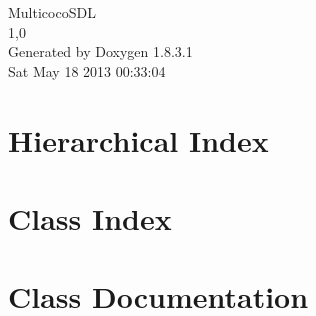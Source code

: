\documentclass{book}
\begin{document}
\hypersetup{pageanchor=false,citecolor=blue}
\begin{titlepage}
\vspace*{7cm}
\begin{center}
{\Large Multicoco\-S\-D\-L \\[1ex]\large 1,0 }\\
\vspace*{1cm}
{\large Generated by Doxygen 1.8.3.1}\\
\vspace*{0.5cm}
{\small Sat May 18 2013 00:33:04}\\
\end{center}
\end{titlepage}
\clearemptydoublepage
{}
\tableofcontents
\clearemptydoublepage
{}
\hypersetup{pageanchor=true,citecolor=blue}
\chapter{Hierarchical Index}

\chapter{Class Index}

\chapter{Class Documentation}















\printindex
\end{document}
